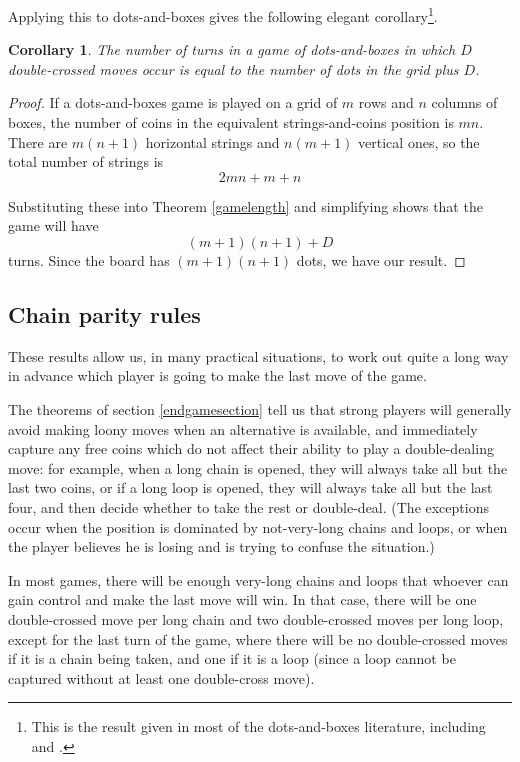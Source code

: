 \documentclass[a4paper,twocolumn]{article}
\newtheorem{dnbgamelength}[thm]{Corollary}
\begin{document}
Applying this to dots-and-boxes gives the following elegant
corollary\footnote{This is the result given in most of the
  dots-and-boxes literature, including \cite{berl} and \cite{wways}.}.

\begin{dnbgamelength}\label{dnbgamelength}
  The number of turns in a game of dots-and-boxes in which $D$
  double-crossed moves occur is equal to the number of dots in the
  grid plus $D$.
\end{dnbgamelength}
\begin{proof}
  If a dots-and-boxes game is played on a grid of $m$ rows and $n$
  columns of boxes, the number of coins in the equivalent
  strings-and-coins position is $mn$. There are $m(n+1)$ horizontal
  strings and $n(m+1)$ vertical ones, so the total number of strings
  is $$2mn + m + n$$

  Substituting these into Theorem \ref{gamelength} and simplifying
  shows that the game will have $$(m+1)(n+1) + D$$ turns.  Since the
  board has $(m+1)(n+1)$ dots, we have our result.
\end{proof}

\subsection{Chain parity rules}

These results allow us, in many practical situations, to work out
quite a long way in advance which player is going to make the last
move of the game.

The theorems of section \ref{endgamesection} tell us that strong
players will generally avoid making loony moves when an alternative is
available, and immediately capture any free coins which do not affect
their ability to play a double-dealing move: for example, when a long
chain is opened, they will always take all but the last two coins, or
if a long loop is opened, they will always take all but the last four,
and then decide whether to take the rest or double-deal. (The
exceptions occur when the position is dominated by not-very-long
chains and loops, or when the player believes he is losing and is
trying to confuse the situation.)

In most games, there will be enough very-long chains and loops that
whoever can gain control and make the last move will win. In that
case, there will be one double-crossed move per long chain and two
double-crossed moves per long loop, except for the last turn of the
game, where there will be no double-crossed moves if it is a chain
being taken, and one if it is a loop (since a loop cannot be captured
without at least one double-cross move).
\end{document}
